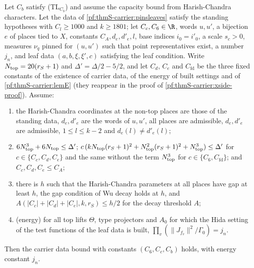\begin{theorem}\label{pf:thmS-carrier:cdbuilt}
Let $C_b$ satisfy (TL$_{C_b}$) and assume the capacity bound from Harish-Chandra characters. Let the data of
\cref{pf:thmS-carrier:pinsleaves} satisfy the standing hypotheses with $C_l\ge1000$ and $k\ge1801$; let $C_c,C_6\in\R$, words
$u,u'$, a bijection $e$ of places tied to $X$, constants $C_A,d_e,d'_e,l$, base indices $i_0=i'_0$, a scale $s_c>0$, measures
$\nu_q$ pinned for $(u,u')$ such that point representatives exist, a number $j_n$, and leaf data $(a,b,\xi,\xi',c)$ satisfying
the leaf condition. Write $N_{\mathrm{top}}=20(r_S+1)$ and $\Delta'=\Delta/2-5/2$, and let $C_d$, $C_e$ and $C_{\mathrm{fd}}$ be
the three fixed constants of the existence of carrier data, of the energy of built settings and of \cref{pf:thmS-carrier:lemE}
(they reappear in the proof of \cref{pf:thmS-carrier:xside-proof}). Assume:
\begin{enumerate}[label=(\alph*)]
\item the Harish-Chandra coordinates at the non-top places are those of the standing data, $d_e,d'_e$ are the words of
  $u,u'$, all places are admissible, $d_e,d'_e$ are admissible, $1\le l\le k-2$ and $d_e(l)\ne d'_e(l)$;
\item $6N_{\mathrm{top}}^3+6N_{\mathrm{top}}\le\Delta'$; $c\,(kN_{\mathrm{top}}(r_S+1)^2+N_{\mathrm{top}}^2(r_S+1)^2+
  N_{\mathrm{top}}^3)\le\Delta'$ for $c\in\{C_c,C_d,C_e\}$ and the same without the term $N_{\mathrm{top}}^3$ for
  $c\in\{C_6,C_{\mathrm{fd}}\}$; and $C_c,C_d,C_e\le C_A$;
\item there is $h$ such that the Harish-Chandra parameters at all places have gap at least $h$, the gap condition of Wu decay
  holds at $h$, and $A(|C_c|+|C_d|+|C_e|,k,r_S)\le h/2$ for the decay threshold $A$;
\item (energy) for all top lifts $\Theta$, type projectors and $A_0$ for which the Hida setting of the test functions of the
  leaf data is built, $\prod_v(\|J_{f_v}\|^2/\Gamma_0)=j_n$.
\end{enumerate}
Then the carrier data bound with constants $(C_6,C_c,C_b)$ holds, with energy constant $j_n$.
\end{theorem}

